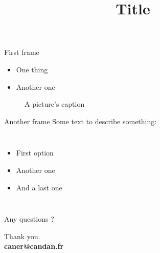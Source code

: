 \documentclass{beamer}
\title[Subtitle]{Title}
\begin{document}
\begin{frame}
  \titlepage
\end{frame}

\begin{frame}{First frame}
  \begin{itemize}
  \item One thing
  \item Another one
  \end{itemize}
  \begin{figure}[h]
    \centering
    \caption{A picture's caption}
  \end{figure}
\end{frame}

\begin{frame}{Another frame}
  Some text to describe something:
  \vspace{0.5cm}
  \begin{columns}[c]
    \column{1.0in}
    \begin{itemize}
    \item First option
    \item Another one
    \item And a last one
    \end{itemize}
    \column{2in}
    \framebox{
    }
  \end{columns}
\end{frame}

\begin{frame}{Any questions ?}

  \begin{center}
    Thank you.\\
    {\bf caner@candan.fr}
  \end{center}

\end{frame}
\end{document}
